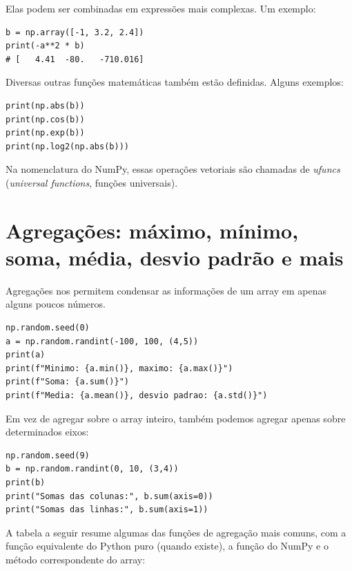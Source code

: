 \documentclass[11pt,a4paper]{article}
\begin{document}
Elas podem ser combinadas em expressões mais complexas. Um exemplo:

\begin{lstlisting}
b = np.array([-1, 3.2, 2.4])
print(-a**2 * b)
# [   4.41  -80.   -710.016]
\end{lstlisting}

Diversas outras funções matemáticas também estão definidas. Alguns
exemplos:

\begin{lstlisting}
print(np.abs(b))
print(np.cos(b))
print(np.exp(b))
print(np.log2(np.abs(b)))
\end{lstlisting}

Na nomenclatura do NumPy, essas operações vetoriais são chamadas de
\emph{ufuncs} (\emph{universal functions}, funções universais).

\section{Agregações: máximo, mínimo, soma, média, desvio padrão e mais}

Agregações nos permitem condensar as informações de um array em apenas
alguns poucos números.

\begin{lstlisting}
np.random.seed(0)
a = np.random.randint(-100, 100, (4,5))
print(a)
print(f"Minimo: {a.min()}, maximo: {a.max()}")
print(f"Soma: {a.sum()}")
print(f"Media: {a.mean()}, desvio padrao: {a.std()}")
\end{lstlisting}

Em vez de agregar sobre o array inteiro, também podemos agregar apenas
sobre determinados eixos:

\begin{lstlisting}
np.random.seed(9)
b = np.random.randint(0, 10, (3,4))
print(b)
print("Somas das colunas:", b.sum(axis=0))
print("Somas das linhas:", b.sum(axis=1))
\end{lstlisting}

A tabela a seguir resume algumas das funções de agregação mais comuns,
com a função equivalente do Python puro (quando existe), a função do
NumPy e o método correspondente do array:
\end{document}

